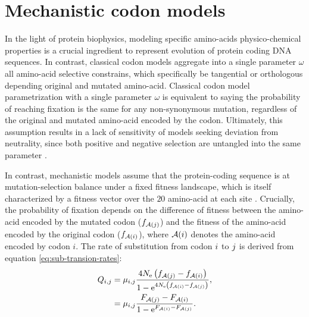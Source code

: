 %


\section{Mechanistic {codon} models}
In the light of protein biophysics, modeling specific amino-acids physico-chemical properties is a crucial ingredient to represent evolution of protein coding \acrshort{DNA} sequences.
In contrast, classical \gls{codon} models aggregate into a single parameter $\omega$ all amino-acid selective constrains, which specifically be tangential or orthologous depending original and mutated amino-acid.
Classical \gls{codon} model parametrization with a single parameter $\omega$ is equivalent to saying the probability of reaching fixation is the same for any non-synonymous mutation, regardless of the original and mutated amino-acid encoded by the \gls{codon}.
Ultimately, this assumption results in a lack of sensitivity of models seeking deviation from neutrality, since both positive and negative selection are untangled into the same parameter \citep{Rodrigue2008a}.

In contrast, mechanistic models assume that the protein-coding sequence is at mutation-selection balance under a fixed fitness landscape, which is itself characterized by a fitness vector over the $20$ amino-acid at each site \citep{Yang2008, Halpern1998, Rodrigue2010}.
Crucially, the probability of fixation depends on the difference of fitness between the amino-acid encoded by the mutated \gls{codon} ($f_{\mathcal{A}({j})}$) and the fitness of the amino-acid encoded by the original \gls{codon} ($f_{\mathcal{A}({i})}$), where $\mathcal{A}({i})$ denotes the amino-acid encoded by \gls{codon} $i$.
The rate of \gls{substitution} from \gls{codon} ${i}$ to ${j}$ is derived from equation \ref{eq:sub-transion-rates}:
\begin{align}
Q_{{i}, {j}} & = \mu_{{i}, {j}} \dfrac{4 N_{\textrm{e}} \left({f_{\mathcal{A}({j})} - f_{\mathcal{A}({i})}}\right)}{{1 - \mathrm{e}^{4 N_{\textrm{e}} \left({f_{\mathcal{A}({i})} - f_{\mathcal{A}({j})}}\right)} }}, \\
& = \mu_{{i}, {j}} \dfrac{F_{\mathcal{A}({j})} - F_{\mathcal{A}({i})}}{1 - \mathrm{e}^{F_{\mathcal{A}({i})} - F_{\mathcal{A}({j})}} }.
\end{align}

